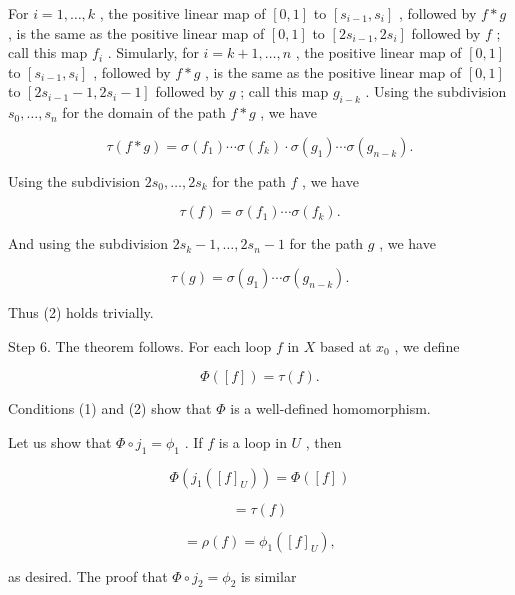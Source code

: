 \documentclass[10pt]{article}
\begin{document}
For \(i = 1,\ldots ,k\) , the positive linear map of \(\left\lbrack  {0,1}\right\rbrack\) to \(\left\lbrack  {{s}_{i - 1},{s}_{i}}\right\rbrack\) , followed by \(f * g\) , is the same as the positive linear map of \(\left\lbrack  {0,1}\right\rbrack\) to \(\left\lbrack  {2{s}_{i - 1},2{s}_{i}}\right\rbrack\) followed by \(f\) ; call this map \({f}_{i}\) . Simularly, for \(i = k + 1,\ldots ,n\) , the positive linear map of \(\left\lbrack  {0,1}\right\rbrack\) to \(\left\lbrack  {{s}_{i - 1},{s}_{i}}\right\rbrack\) , followed by \(f * g\) , is the same as the positive linear map of \(\left\lbrack  {0,1}\right\rbrack\) to \(\left\lbrack  {2{s}_{i - 1} - 1,2{s}_{i} - 1}\right\rbrack\) followed by \(g\) ; call this map \({g}_{i - k}\) . Using the subdivision \({s}_{0},\ldots ,{s}_{n}\) for the domain of the path \(f * g\) , we have

\[
\tau \left( {f * g}\right)  = \sigma \left( {f}_{1}\right) \cdots \sigma \left( {f}_{k}\right)  \cdot  \sigma \left( {g}_{1}\right) \cdots \sigma \left( {g}_{n - k}\right) .
\]

Using the subdivision \(2{s}_{0},\ldots ,2{s}_{k}\) for the path \(f\) , we have

\[
\tau \left( f\right)  = \sigma \left( {f}_{1}\right) \cdots \sigma \left( {f}_{k}\right) .
\]

And using the subdivision \(2{s}_{k} - 1,\ldots ,2{s}_{n} - 1\) for the path \(g\) , we have

\[
\tau \left( g\right)  = \sigma \left( {g}_{1}\right) \cdots \sigma \left( {g}_{n - k}\right) .
\]

Thus (2) holds trivially.

Step 6. The theorem follows. For each loop \(f\) in \(X\) based at \({x}_{0}\) , we define

\[
\Phi \left( \left\lbrack  f\right\rbrack  \right)  = \tau \left( f\right) .
\]

Conditions (1) and (2) show that \(\Phi\) is a well-defined homomorphism.

Let us show that \(\Phi  \circ  {j}_{1} = {\phi }_{1}\) . If \(f\) is a loop in \(U\) , then

\[
\Phi \left( {{j}_{1}\left( {\left\lbrack  f\right\rbrack  }_{U}\right) }\right)  = \Phi \left( \left\lbrack  f\right\rbrack  \right)
\]

\[
= \tau \left( f\right)
\]

\[
= \rho \left( f\right)  = {\phi }_{1}\left( {\left\lbrack  f\right\rbrack  }_{U}\right) ,
\]

as desired. The proof that \(\Phi  \circ  {j}_{2} = {\phi }_{2}\) is similar
\end{document}
